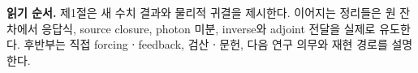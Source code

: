 \noindent{}
\newpage
\begingroup\small\setlength{\parskip}{0pt}\tableofcontents\endgroup
\vspace{4mm}
\noindent\textbf{읽기 순서.} 제1절은 새 수치 결과와 물리적 귀결을 제시한다. 이어지는 정리들은 원 잔차에서 응답식, source closure, photon 미분, inverse와 adjoint 전달을 실제로 유도한다. 후반부는 직접 forcingㆍfeedback, 검산ㆍ문헌, 다음 연구 의무와 재현 경로를 설명한다.
\newpage







